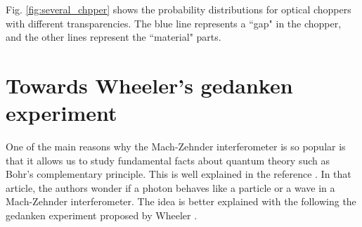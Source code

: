 \documentclass[12pt]{book}
\begin{document}
 

Fig. \ref{fig:several_chpper} shows the probability distributions for optical choppers with different transparencies. The blue line represents a ``gap" in the chopper, and the other lines represent the ``material" parts.
\section{Towards Wheeler's gedanken experiment}

One of the main reasons why the Mach-Zehnder interferometer is so popular is that it allows us to study fundamental facts about quantum theory such as Bohr's complementary principle. This is well explained in the reference \cite{delayed}. In that article, the authors wonder if a photon behaves like a particle or a wave in a Mach-Zehnder interferometer. The idea is better explained with the following the gedanken experiment proposed by Wheeler \cite{delayed}.
\end{document}
